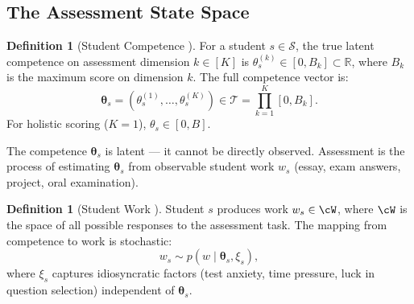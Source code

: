 \documentclass[11pt,a4paper]{article}
\theoremstyle{definition}
\newtheorem{definition}[theorem]{Definition}
\theoremstyle{remark}
\newcommand{\R}{\mathbb{R}}
\newcommand{\cS}{\mathcal{S}}
\newcommand{\cT}{\mathcal{T}}
\newcommand{\studentSet}{\cS}
\newcommand{\trueScore}{\theta}
\begin{document}
\subsection{The Assessment State Space}
\begin{definition}[Student Competence ]
\label{def:competence}
For a student $s \in \studentSet$, the true latent competence on assessment dimension $k \in [K]$ is $\trueScore_s^{(k)} \in [0, B_k] \subset \R$, where $B_k$ is the maximum score on dimension $k$. The full competence vector is:
\begin{equation}
    \boldsymbol{\trueScore}_s = (\trueScore_s^{(1)}, \ldots, \trueScore_s^{(K)}) \in \cT = \prod_{k=1}^K [0, B_k].
\end{equation}
For holistic scoring ($K=1$), $\trueScore_s \in [0, B]$.
\end{definition}
The competence $\boldsymbol{\trueScore}_s$ is latent — it cannot be directly observed. Assessment is the process of estimating $\boldsymbol{\trueScore}_s$ from observable student work $w_s$ (essay, exam answers, project, oral examination).
\begin{definition}[Student Work ]
\label{def:work}
Student $s$ produces work $w_s \in \cW$, where $\cW$ is the space of all possible responses to the assessment task. The mapping from competence to work is stochastic:
\begin{equation}
    w_s \sim p(w \mid \boldsymbol{\trueScore}_s, \xi_s),
\end{equation}
where $\xi_s$ captures idiosyncratic factors (test anxiety, time pressure, luck in question selection) independent of $\boldsymbol{\trueScore}_s$.
\end{definition}
\end{document}
